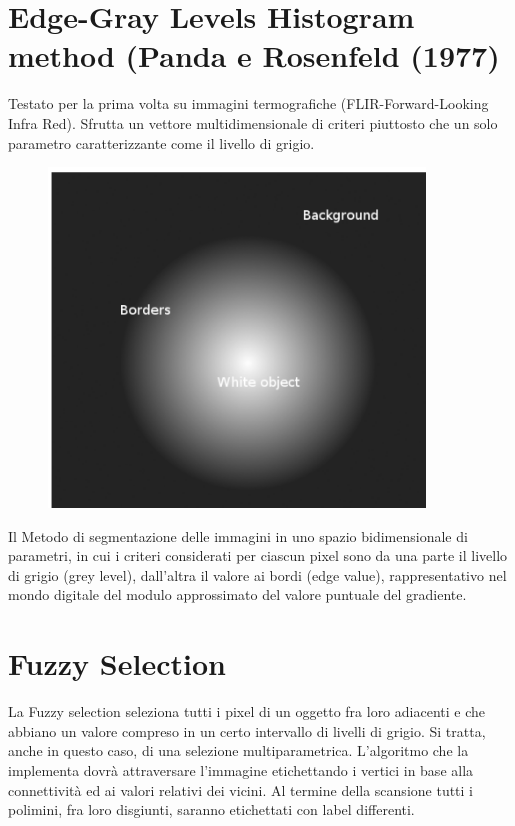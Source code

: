 \newpage
\section{Edge-Gray Levels Histogram method (Panda e Rosenfeld (1977)}
Testato per la prima volta su immagini termografiche (FLIR-Forward-Looking Infra Red). Sfrutta un vettore multidimensionale di criteri piuttosto che un solo parametro caratterizzante come il livello di grigio.

\begin{figure}[H]
    \centering
    \includegraphics[width=10cm, keepaspectratio]{capitoli/immagini/imgs/rosenfeld.png}
\end{figure}

Il Metodo di segmentazione delle immagini in uno spazio bidimensionale di parametri, in cui i criteri considerati per ciascun
pixel sono da una parte il livello di grigio (grey level), dall'altra il valore ai bordi (edge value), rappresentativo nel mondo digitale del
modulo approssimato del valore puntuale del gradiente.

\newpage
\section{Fuzzy Selection}

La Fuzzy selection seleziona tutti i pixel di un oggetto fra loro adiacenti e che abbiano un valore compreso in un certo intervallo di livelli di grigio.
Si tratta, anche in questo caso, di una selezione multiparametrica. L'algoritmo che la implementa dovrà attraversare l'immagine etichettando i vertici in base alla connettività ed ai valori relativi dei vicini.
Al termine della scansione tutti i polimini, fra loro disgiunti, saranno etichettati con label differenti.

